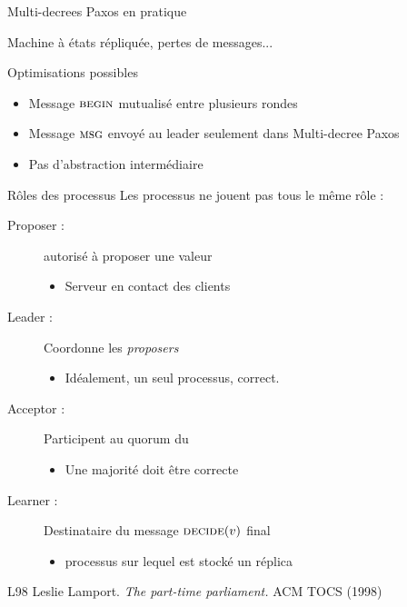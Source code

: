
\begingroup

\begin{frame}{Multi-decrees Paxos en pratique}

  Machine à états répliquée, pertes de messages...

  \begin{block}{Optimisations possibles}
    \vspace{-1mm}
    \begin{itemize}
    \item Message $\textsc{begin}$ mutualisé entre plusieurs rondes
    \item Message $\textsc{msg}$ envoyé au leader seulement dans Multi-decree Paxos
    \item Pas d'abstraction intermédiaire
    \end{itemize}
  \end{block}

  \begin{block}{Rôles des processus}
    \vspace{-1mm}
    Les processus ne jouent pas tous le même rôle :
    \begin{description}
    \item[Proposer :] autorisé à proposer une valeur
      \begin{itemize}
      \item \vspace{-1mm} Serveur en contact des clients
      \end{itemize}
    \item[Leader :] Coordonne les \emph{proposers}
      \begin{itemize}
      \item \vspace{-1mm} Idéalement, un seul processus, correct. 
      \end{itemize}
    \item[Acceptor :] Participent au quorum du 
      \begin{itemize}
      \item \vspace{-1mm} Une majorité doit être correcte
      \end{itemize}
    \item[Learner :] Destinataire du message $\textsc{decide}(v)$ final
      \begin{itemize}
      \item \vspace{-1mm} processus sur lequel est stocké un réplica
      \end{itemize}
    \end{description}
  \end{block}

  \vfill
  \begin{citing}
  \item[L98] Leslie Lamport. \emph{The part-time parliament.} ACM TOCS (1998)
  \end{citing}

\end{frame}

\endgroup
\endinput
